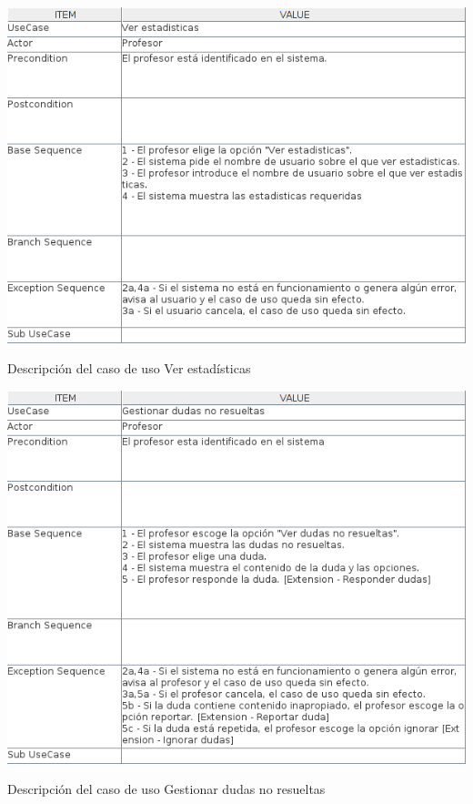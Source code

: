 \documentclass[openright,twoside,10pt]{book}
\begin{document}
    \vspace*{\fill}
    
    \newpage
    
    \vspace*{\fill}
    
    \begin{table}[H]
        \begin{center}
            \includegraphics[width=\textwidth]{img/astah/analisis/casos_de_uso/useCase07.png}
        \end{center}
        \caption{Descripción del caso de uso Ver estadísticas}
    \end{table}
    
    \vspace*{\fill}
    
    \newpage
    
    \vspace*{\fill}
    
    \begin{table}[H]
        \begin{center}
            \includegraphics[width=\textwidth]{img/astah/analisis/casos_de_uso/useCase08.png}
        \end{center}
        \caption{Descripción del caso de uso Gestionar dudas no resueltas}
    \end{table}
    
\end{document}
